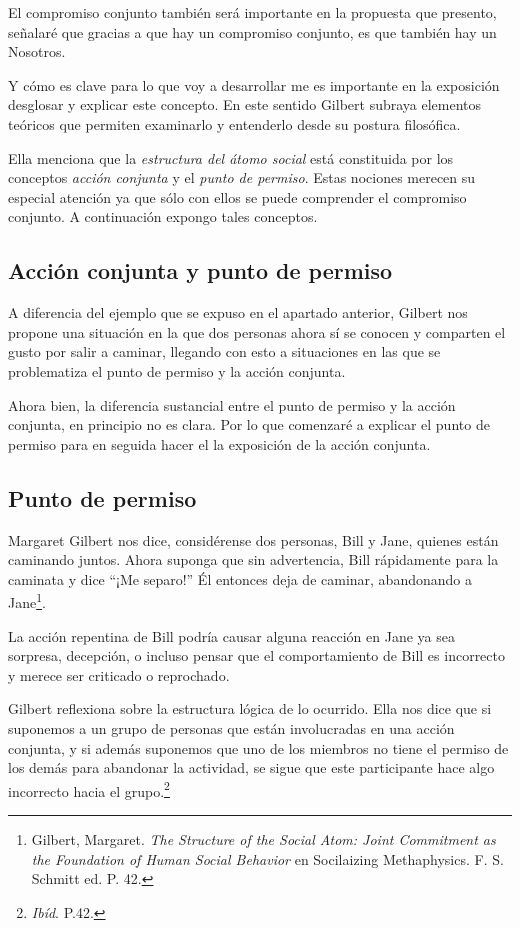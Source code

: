 \documentclass[oneside]{book}
\begin{document}
El compromiso conjunto también será importante en la propuesta que presento, señalaré que gracias a que hay un compromiso conjunto, es que también hay un Nosotros. 

Y cómo es clave para lo que voy a desarrollar me es importante en la exposición desglosar y explicar este concepto. En este sentido Gilbert subraya elementos teóricos que permiten examinarlo y entenderlo desde su postura filosófica.

Ella menciona que la \textit{estructura del átomo social} está constituida por los conceptos \textit{acción conjunta} y el \textit{punto de permiso}. Estas nociones merecen su especial atención ya que sólo con ellos se puede comprender el compromiso conjunto. A continuación expongo tales conceptos.

\subsection{Acción conjunta y punto de permiso}
A diferencia del ejemplo que se expuso en el apartado anterior, Gilbert nos propone una situación en la que dos personas ahora sí se conocen y comparten el gusto por salir a caminar, llegando con esto a situaciones en las que se problematiza el punto de permiso y la acción conjunta.
	
Ahora bien, la diferencia sustancial entre el punto de permiso y la acción conjunta, en principio no es clara. Por lo que comenzaré a explicar el punto de permiso para en seguida hacer el la exposición de la acción conjunta.

\subsection*{Punto de permiso}

Margaret Gilbert nos dice, considérense dos personas, Bill y Jane, quienes  están caminando juntos. Ahora suponga que sin advertencia, Bill rápidamente para la caminata y dice “¡Me separo!” Él entonces deja de caminar, abandonando a Jane\footnote{Gilbert, Margaret. \textit{The Structure of the Social Atom: Joint Commitment as the Foundation of Human Social Behavior} en Socilaizing Methaphysics. F. S. Schmitt ed. P. 42.}.

La acción repentina de Bill podría causar alguna reacción en Jane ya sea sorpresa, decepción, o incluso pensar que el comportamiento de Bill es incorrecto y merece ser criticado o reprochado.

Gilbert reflexiona sobre la estructura lógica de lo ocurrido. Ella nos dice que si suponemos a un grupo de personas que están involucradas en una acción conjunta, y si además suponemos que uno de los miembros no tiene el permiso de los demás para abandonar la actividad, se sigue que este participante hace algo incorrecto hacia el grupo.\footnote{\textit{Ibíd}. P.42.}
\end{document}
